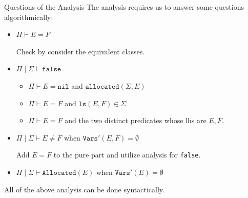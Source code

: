 \documentclass[aspectratio=1610, 13pt]{beamer}
\begin{document}
\begin{frame}{Questions of the Analysis}
The analysis requires us to answer some questions algorithmically:
    \begin{itemize}
        \item $\Pi\vdash E = F$
        
        Check by consider the equivalent classes.
        
        
        
        \item $\Pi\mid \Sigma \vdash \texttt{false}$
        \begin{itemize}
            \item $\Pi\vdash E = \texttt{nil}$ and $\texttt{allocated}(\Sigma, E)$
            \item $\Pi\vdash E = F$ and $\texttt{ls}(E,F)\in \Sigma$
            \item $\Pi\vdash E = F$ and the two distinct predicates whose lhs are $E,F$.
        \end{itemize}
        \item $\Pi\mid \Sigma \vdash E\ne F $ when $\texttt{Vars}'(E, F)=\emptyset$
        
        Add $E = F$ to the pure part and utilize analysis for \texttt{false}.
        
        \item $\Pi\mid \Sigma \vdash \texttt{Allocated}(E)$ when $ \texttt{Vars}'(E)=\emptyset$
    \end{itemize}
    All of the above analysis can be done syntactically.
\end{frame}
\end{document}
